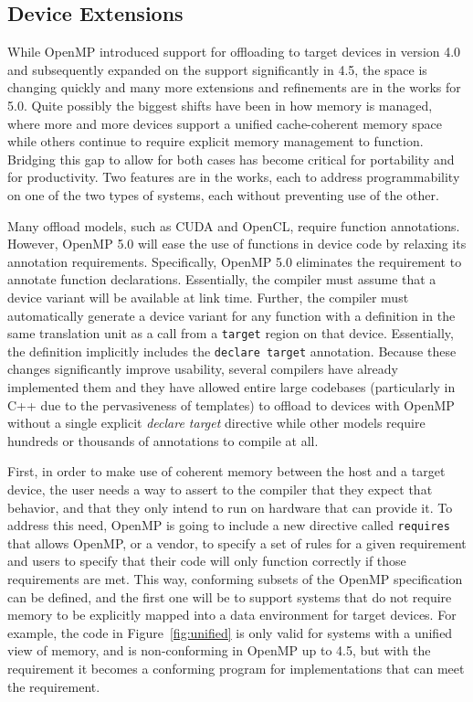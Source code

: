 \subsection{Device Extensions}
\label{sub:device_extensions}

While OpenMP introduced support for offloading to target devices in version 4.0
and subsequently expanded on the support significantly in 4.5, the space is
changing quickly and many more extensions and refinements are in the works for
5.0.  Quite possibly the biggest shifts have been in how memory is managed,
where more and more devices support a unified cache-coherent memory space
while others continue to require explicit memory management to function.
Bridging this gap to allow for both cases has become critical for portability
and for productivity.  Two features are in the works, each to address
programmability on one of the two types of systems, each without preventing use
of the other.


Many offload models, such as CUDA and OpenCL, require function annotations. 
However, OpenMP 5.0 will ease the use of functions in device code by relaxing 
its annotation requirements. Specifically, OpenMP 5.0 eliminates the 
requirement to annotate function declarations. Essentially, the compiler 
must assume that a device variant will be available at link time. Further, 
the compiler must automatically generate a device variant for any function 
with a definition in the same translation unit as a call from a 
\texttt{target} region on that device. Essentially, the definition implicitly 
includes the \texttt{declare target} annotation. Because these changes 
significantly improve usability, several compilers have already implemented 
them and they have allowed entire large codebases (particularly in C++ 
due to the pervasiveness of templates) to offload to devices with OpenMP 
without a single explicit \emph{declare target} directive while other 
models require hundreds or thousands of annotations to compile at all.

First, in order to make use of coherent memory between the host and a target
device, the user needs a way to assert to the compiler that they expect that
behavior, and that they only intend to run on hardware that can provide it.  To
address this need, OpenMP is going to include a new directive called
\texttt{requires} that allows OpenMP, or a vendor, to specify a set of rules for
a given requirement and users to specify that their code will only function
correctly if those requirements are met.  This way, conforming subsets of the
OpenMP specification can be defined, and the first one will be to support
systems that do not require memory to be explicitly mapped into a data
environment for target devices.  For example, the code in
Figure~\ref{fig:unified} is only valid for systems with a unified view of
memory, and is non-conforming in OpenMP up to 4.5, but with the requirement it
becomes a conforming program for implementations that can meet the requirement.

